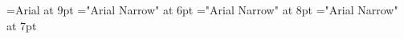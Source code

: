 \font\helv=Arial at 9pt
\font\helvx="Arial Narrow" at 6pt
\font\helvy="Arial Narrow" at 8pt
\font\helvz="Arial Narrow" at 7pt

\def\ofs#1#2#3{}
\let\ofspc\pcxxv
\let\redpc\pcfee
\let\newgh\pcblu

\long{}

\let\pageno\page

\newcount\ltfirstpage








\def\Hstrut{\vrule height12pt depth5pt width0pt}
\def\tvrule{\vrule}
\def\tvrulex{\vrule width1pt\relax}
\def\tablerule{\noalign{\allowbreak\hrule}}
\def\thead{\Sans\nine\rm}
\def\theadrule{\noalign{\hrule height1pt\relax}}
\def\tbodybreak{\noalign{\allowbreak}}

\let\fourteen\Large
\let\twelve\large
\let\ten\normal
\let\nine\small
\let\eight\small
\let\seven\small
\let\six\footnotesize

\let\Sans\sf

\def\Hsub#1{#1}

\def\cdlighnopng{\vbox{\vfil\hbox{(-)\hfil}\vfil}}

\def\cvi{\pcseqi}
\def\cvii{\pcseqii}
\def\cviii{\pcseqiii}
\def\cviv{\pcseqiv}
\def\cvv{\pcseqv}
\def\cvvi{\pccvvi}
\def\cvxcix{\pccvxcix}
\def\cvxcviii{\pccvxcviii}

\def\cv#1#2{%
  \ifnum#2=1\cvi
  \else
    \ifnum#2=2\cvii
    \else
      \ifnum#2=3\cviii
      \else
        \ifnum#2=4\cviv
        \else
          \ifnum#2=5\cvv
          \else
            \ifnum#2=6\cvvi
            \else
              \ifnum#2=8\cvxcviii
              \else
                \ifnum#2=9\cvxcix\fi
              \fi
            \fi
          \fi
        \fi
      \fi
    \fi
  \fi
}


\def\beginDisplay{\begingroup\narrower}
\def\endDisplay{\endgroup}

\let\usetoc\relax

\let\supereject\relax

\let\preamble\relax
\let\sectionsintocfalse\relax
\let\subsectionsintocfalse\relax
\let\useapp\relax

\def\xgraphicsfigure#1#2#3#4{}


\let\ccempty\relax

\def\code#1{{\small\sf#1}}

